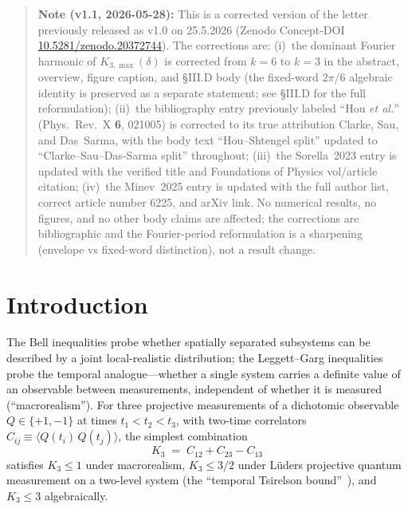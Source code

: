 \documentclass[aps,prx,reprint,amsmath,amssymb,floatfix,nofootinbib,superscriptaddress]{revtex4-2}
\begin{document}
\maketitle

\begin{quote}\small                                                                %
\textbf{Note (v1.1, 2026-05-28):} This is a corrected version of the              %
letter previously released as v1.0 on 25.5.2026 (Zenodo Concept-DOI               %
\href{https://doi.org/10.5281/zenodo.20372744}{10.5281/zenodo.20372744}).         %
The corrections are: (i)~the dominant Fourier harmonic of                          %
$K_{3,\max}(\delta)$ is corrected from $k=6$ to $k=3$ in the abstract,             %
overview, figure caption, and §III.D body (the fixed-word $2\pi/6$                 %
algebraic identity is preserved as a separate statement; see §III.D for            %
the full reformulation); (ii)~the bibliography entry previously labeled            %
``Hou \emph{et al.}'' (Phys.\ Rev.\ X \textbf{6}, 021005) is corrected             %
to its true attribution Clarke, Sau, and Das~Sarma, with the body text             %
``Hou--Shtengel split'' updated to ``Clarke--Sau--Das-Sarma split''                %
throughout; (iii)~the Sorella~2023 entry is updated with the verified              %
title and Foundations of Physics vol/article citation; (iv)~the                    %
Minev~2025 entry is updated with the full author list, correct article             %
number 6225, and arXiv link. No numerical results, no figures, and no              %
other body claims are affected; the corrections are bibliographic and              %
the Fourier-period reformulation is a sharpening (envelope vs                      %
fixed-word distinction), not a result change.                                      %
\end{quote}                                                                        %

\section{Introduction}

The Bell inequalities probe whether spatially separated subsystems can
be described by a joint local-realistic distribution; the
Leggett--Garg inequalities~\cite{LeggettGarg1985} probe the temporal
analogue---whether a single system carries a definite value of an
observable between measurements, independent of whether it is measured
(``macrorealism''). For three projective measurements of a dichotomic
observable $Q \in \{+1,-1\}$ at times $t_{1} < t_{2} < t_{3}$, with
two-time correlators $C_{ij} \equiv \langle Q(t_{i})\,Q(t_{j}) \rangle$,
the simplest combination
\begin{equation}
  K_{3} \;=\; C_{12} + C_{23} - C_{13}
\end{equation}
satisfies $K_{3} \leq 1$ under macrorealism, $K_{3} \leq 3/2$ under
L\"uders projective quantum measurement on a two-level system (the
``temporal Tsirelson bound''~\cite{Budroni2014}), and $K_{3} \leq 3$
algebraically.
\end{document}
